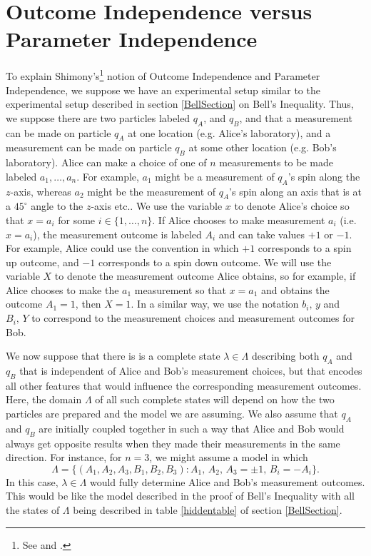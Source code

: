 
\section{Outcome Independence versus Parameter Independence}
To explain Shimony's\footnote{See \cite[146-147]{Shimony86} and \cite[7-9]{Butterfield}.}  notion of  Outcome Independence and Parameter Independence, we suppose we have an experimental setup similar to the experimental setup described in section \ref{BellSection} on Bell's Inequality. Thus, we suppose there are two particles labeled $q_A$, and $q_B$, and that a measurement can be made on particle  $q_A$ at one location (e.g. Alice's laboratory), and a measurement can be made on particle $q_B$ at some other location (e.g. Bob's laboratory). Alice can make a choice of one of $n$ measurements to be made labeled $a_1,\ldots, a_n$. For example, $a_1$ might be a measurement of $q_A$'s spin along the $z$-axis, whereas $a_2$ might be the measurement of $q_A$'s spin along an axis that is at  a $45^\circ$ angle to the $z$-axis etc.. We use the variable $x$ to denote Alice's choice so that $x=a_i$ for some $i\in\{1,\ldots,n\}$. If Alice chooses to make measurement $a_i$ (i.e. $x=a_i$), the measurement outcome is labeled $A_i$ and can take values $+1$ or $-1$. For example, Alice could use the convention in which $+1$ corresponds to a spin up outcome, and $-1$ corresponds to a spin down outcome. We will use the variable $X$ to denote the measurement outcome Alice obtains, so for example, if Alice chooses to make the $a_1$ measurement so that $x=a_1$ and obtains the outcome $A_1=1$, then $X=1$. In a similar way, we use the notation $b_i,\, y$ and $B_i,\, Y$ to correspond to the measurement choices and measurement outcomes for Bob.

We now suppose that there is is a complete state $\lambda\in\Lambda$ describing both $q_A$ and $q_B$ that is independent of Alice and Bob's measurement choices, but that encodes all other features that would influence the corresponding measurement outcomes. Here, the domain $\Lambda$ of all such complete states will depend on how the two particles are prepared and the model we are assuming. We also assume that  $q_A$ and $q_B$ are initially coupled together in such a way that Alice and Bob would always get opposite results when they made their measurements in the same direction. For instance, for $n=3$, we might assume a model in which 
\begin{equation}\label{bellLambda}
\Lambda=\big\{(A_1, A_2, A_3 ,B_1, B_2, B_3):A_1,\, A_2,\, A_3=\pm1,\, B_i=-A_i\big\}.
\end{equation}
 In this case, $\lambda\in\Lambda$ would fully determine Alice and Bob's measurement outcomes. This would be like the model described in the proof of Bell's Inequality with all the states of $\Lambda$ being described in table \ref{hiddentable} of section \ref{BellSection}. 
 
